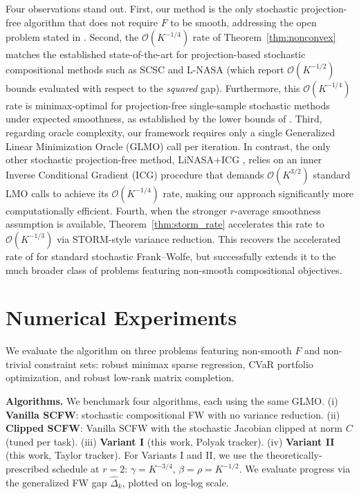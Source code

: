 \documentclass{article}
\begin{document}
Four observations stand out. First, our method is the only stochastic projection-free algorithm that does not require $F$ to be smooth, addressing the open problem stated in \citet{vladarean2023first}. Second, the $\mathcal{O}(K^{-1/4})$ rate of Theorem~\ref{thm:nonconvex} matches the established state-of-the-art for projection-based stochastic compositional methods such as SCSC and L-NASA (which report $\mathcal{O}(K^{-1/2})$ bounds evaluated with respect to the \emph{squared} gap). Furthermore, this $\mathcal{O}(K^{-1/4})$ rate is minimax-optimal for projection-free single-sample stochastic methods under expected smoothness, as established by the lower bounds of \citet{arjevani2023lower}. Third, regarding oracle complexity, our framework requires only a single Generalized Linear Minimization Oracle (GLMO) call per iteration. In contrast, the only other stochastic projection-free method, LiNASA+ICG \citep{xiao2022projection}, relies on an inner Inverse Conditional Gradient (ICG) procedure that demands $\mathcal{O}(K^{3/2})$ standard LMO calls to achieve its $\mathcal{O}(K^{-1/4})$ rate, making our approach significantly more computationally efficient. Fourth, when the stronger $r$-average smoothness assumption is available, Theorem~\ref{thm:storm_rate} accelerates this rate to $\mathcal{O}(K^{-1/3})$ via STORM-style variance reduction. This recovers the accelerated rate of \citet{yurtsever2019conditional} for standard stochastic Frank--Wolfe, but successfully extends it to the much broader class of problems featuring non-smooth compositional objectives.

\section{Numerical Experiments} \label{sec:experiments}

We evaluate the algorithm on three problems featuring non-smooth $F$ and non-trivial constraint sets: robust minimax sparse regression, CVaR portfolio optimization, and robust low-rank matrix completion.

\textbf{Algorithms.}
We benchmark four algorithms, each using the same GLMO. (i) \textbf{Vanilla SCFW}: stochastic compositional FW with no variance reduction. (ii) \textbf{Clipped SCFW}: Vanilla SCFW with the stochastic Jacobian clipped at norm $C$ (tuned per task). (iii) \textbf{Variant I} (this work, Polyak tracker). (iv) \textbf{Variant II} (this work, Taylor tracker). For Variants I and II, we use the theoretically-prescribed schedule at $r = 2$: $\gamma = K^{-3/4}$, $\beta = \rho = K^{-1/2}$. We evaluate progress via the generalized FW gap $\hat\Delta_k$, plotted on log-log scale.
\end{document}
